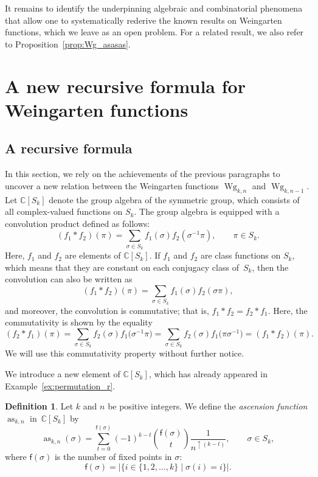 \documentclass[pdftex]{sigma}
\numberwithin{equation}{section}
\theoremstyle{definition}
\newtheorem{Definition}[Theorem]{Definition}
\newcommand{\fix}[1]{\mathsf{f}(#1)}
\DeclareMathOperator{\Raise}{as}
\DeclareMathOperator{\Wg}{Wg}
\begin{document}
It remains to identify the underpinning algebraic and combinatorial phenomena that allow one to systematically rederive the known results on Weingarten functions, which we leave as an open problem.
For a related result, we also refer to Proposition~\ref{prop:Wg_asasas}.

\section{A new recursive formula for Weingarten functions} \label{section:Wg_recursive}

\subsection{A recursive formula}

In this section, we rely on the achievements of the previous paragraphs to uncover a new relation between the Weingarten functions
$\Wg_{k,n}$ and $\Wg_{k,n-1}$.
Let $\mathbb{C}[S_k]$ denote the group algebra of the symmetric group,
which consists of all complex-valued functions on $S_k$.
The group algebra is equipped with a convolution product defined as follows:
\[
(f_1*f_2)(\pi)= \sum_{\sigma \in S_k} f_1(\sigma) f_2(\sigma^{-1} \pi), \qquad \pi \in S_k.
\]
Here, $f_1$ and $f_2$ are elements of $\mathbb{C}[S_k]$.
If $f_1$ and $f_2$ are class functions on $S_k$, which means that they are constant on each conjugacy class of~$S_k$,
then the convolution can also be written as
\[
(f_1*f_2)(\pi)= \sum_{\sigma \in S_k} f_1(\sigma) f_2(\sigma \pi),
\]
and moreover, the convolution is commutative; that is, $f_1*f_2=f_2*f_1$.
Here, the commutativity is shown by the equality
\[
(f_2*f_1)(\pi) =\sum_{\sigma \in S_k} f_2(\sigma) f_1\bigl(\sigma^{-1} \pi\bigr)
= \sum_{\sigma \in S_k} f_2(\sigma) f_1\bigl(\pi \sigma^{-1}\bigr) =(f_1*f_2)(\pi).
\]
We will use this commutativity property without further notice.

We introduce a new element of $\mathbb{C}[S_k]$, which has already appeared in Example~\ref{ex:permutation_r}.

\begin{Definition} \label{def:function_a}
Let $k$ and $n$ be positive integers.
We define the \emph{ascension function} $\Raise_{k,n}$ in~$\mathbb{C}[S_k]$ by
 \[
\Raise_{k,n}(\sigma)= \sum_{t=0}^{\fix{\sigma}} (-1)^{k-t} \binom{\fix{\sigma}}{t} \frac{1}{n^{\uparrow (k-t)}},
\qquad \sigma \in S_k,
 \]
 where $\fix{\sigma}$ is the number of fixed points in $\sigma$:
 \[
 \fix{\sigma} =|\{i \in \{1,2,\dots,k\} \mid \sigma(i)=i\}|.
 \]
\end{Definition}
\end{document}
